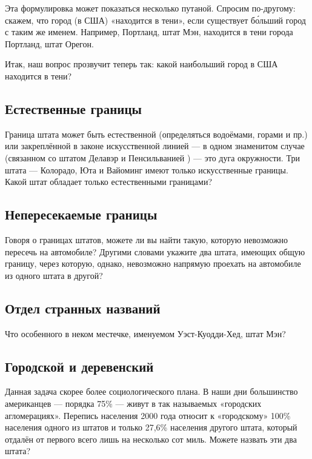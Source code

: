 \medskip

Эта формулировка может показаться несколько путаной.
Спросим по-другому: скажем, что город (в США) «находится в тени», если существует б\'{о}льший город с таким же именем.
Например, Портланд, штат Мэн, находится в тени города Портланд, штат Орегон.

Итак, наш вопрос прозвучит теперь так: какой наибольший город в США находится в тени?   

\subsection*{Естественные границы}%

Граница штата может быть естественной (определяться водоёмами, горами и пр.) или 
закреплённой в законе искусственной линией --- в одном знаменитом случае (связанном со штатом Делавэр и Пенсильванией ) --- это дуга окружности.
Три штата --- Колорадо, Юта и Вайоминг имеют только искусственные границы.
Какой штат обладает только естественными границами?   

\subsection*{Непересекаемые границы}%

Говоря о границах штатов, можете ли вы найти такую, которую невозможно пересечь на автомобиле? Другими словами укажите два штата, имеющих общую границу, через которую, однако, невозможно напрямую проехать на автомобиле из одного штата в другой?   

\subsection*{Отдел странных названий}%

Что особенного в неком местечке, именуемом Уэст-Куодди-Хед, %
штат Мэн?   

\subsection*{Городской и деревенский}%

Данная задача скорее более социологического плана.
В наши дни большинство американцев --- порядка 75\% --- живут в так называемых «городских агломерациях».
Перепись населения 2000 года относит к «городскому» 100\% населения одного из штатов и только 27,6\% населения другого штата, который отдалён от первого всего лишь на несколько сот миль.
Можете назвать эти два штата?   

